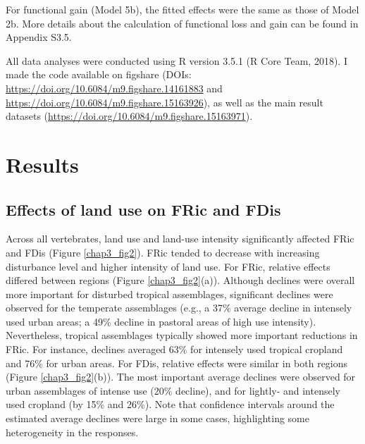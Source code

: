 For functional gain (Model 5b), the fitted effects were the same as those of Model 2b. More details about the calculation of functional loss and gain can be found in Appendix S3.5.

All data analyses were conducted using R version 3.5.1 (R Core Team, 2018). I made the code available on figshare (DOIs: \url{https://doi.org/10.6084/m9.figshare.14161883} and \url{https://doi.org/10.6084/m9.figshare.15163926}), as well as the main result datasets (\url{https://doi.org/10.6084/m9.figshare.15163971}).

\section{Results}

\subsection{Effects of land use on FRic and FDis}

Across all vertebrates, land use and land-use intensity significantly affected FRic and FDis (Figure \ref{chap3_fig2}). FRic tended to decrease with increasing disturbance level and higher intensity of land use. For FRic, relative effects differed between regions (Figure \ref{chap3_fig2}(a)). Although declines were overall more important for disturbed tropical assemblages, significant declines were observed for the temperate assemblages (e.g., a 37\% average decline in intensely used urban areas; a 49\% decline in pastoral areas of high use intensity). Nevertheless, tropical assemblages typically showed more important reductions in FRic. For instance, declines averaged 63\% for intensely used tropical cropland and 76\% for urban areas. For FDis, relative effects were similar in both regions (Figure \ref{chap3_fig2}(b)). The most important average declines were observed for urban assemblages of intense use (20\% decline), and for lightly- and intensely used cropland (by 15\% and 26\%). Note that confidence intervals around the estimated average declines were large in some cases, highlighting some heterogeneity in the responses.

